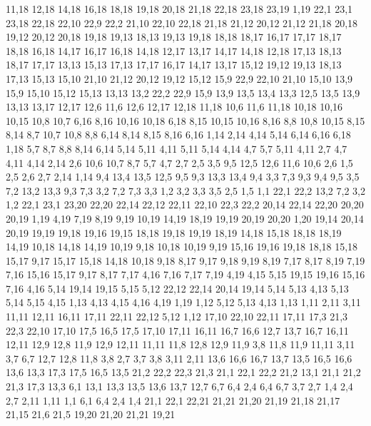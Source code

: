 11,18
12,18
14,18
16,18
18,18
19,18
20,18
21,18
22,18
23,18
23,19
1,19
%
22,1
23,1
23,18
22,18
22,10
22,9
22,2
%
21,10
22,10
22,18
21,18
21,12
%
20,12
21,12
21,18
20,18
%
19,12
20,12
20,18
19,18
19,13
%
18,13
19,13
19,18
18,18
18,17
%
16,17
17,17
18,17
18,18
16,18
%
14,17
16,17
16,18
14,18
%
12,17
13,17
14,17
14,18
12,18
%
17,13
18,13
18,17
17,17
%
13,13
15,13
17,13
17,17
16,17
14,17
13,17
%
15,12
19,12
19,13
18,13
17,13
15,13
%
15,10
21,10
21,12
20,12
19,12
15,12
%
15,9
22,9
22,10
21,10
15,10
%
13,9
15,9
15,10
15,12
15,13
13,13
%
13,2
22,2
22,9
15,9
13,9
13,5
13,4
13,3
%
12,5
13,5
13,9
13,13
13,17
12,17
12,6
%
11,6
12,6
12,17
12,18
11,18
%
10,6
11,6
11,18
10,18
10,16
10,15
10,8
10,7
%
6,16
8,16
10,16
10,18
6,18
%
8,15
10,15
10,16
8,16
%
8,8
10,8
10,15
8,15
8,14
%
8,7
10,7
10,8
8,8
%
6,14
8,14
8,15
8,16
6,16
%
1,14
2,14
4,14
5,14
6,14
6,16
6,18
1,18
%
5,7
8,7
8,8
8,14
6,14
5,14
5,11
%
4,11
5,11
5,14
4,14
%
4,7
5,7
5,11
4,11
%
2,7
4,7
4,11
4,14
2,14
%
2,6
10,6
10,7
8,7
5,7
4,7
2,7
%
2,5
3,5
9,5
12,5
12,6
11,6
10,6
2,6
%
1,5
2,5
2,6
2,7
2,14
1,14
%
9,4
13,4
13,5
12,5
9,5
%
9,3
13,3
13,4
9,4
%
3,3
7,3
9,3
9,4
9,5
3,5
%
7,2
13,2
13,3
9,3
7,3
%
3,2
7,2
7,3
3,3
%
1,2
3,2
3,3
3,5
2,5
1,5
%
1,1
22,1
22,2
13,2
7,2
3,2
1,2
22,1
23,1
23,20
22,20
22,14
22,12
22,11
22,10
22,3
22,2
%
20,14
22,14
22,20
20,20
20,19
%
1,19
4,19
7,19
8,19
9,19
10,19
14,19
18,19
19,19
20,19
20,20
1,20
%
19,14
20,14
20,19
19,19
19,18
19,16
19,15
%
18,18
19,18
19,19
18,19
%
14,18
15,18
18,18
18,19
14,19
%
10,18
14,18
14,19
10,19
%
9,18
10,18
10,19
9,19
%
15,16
19,16
19,18
18,18
15,18
15,17
%
9,17
15,17
15,18
14,18
10,18
9,18
%
8,17
9,17
9,18
9,19
8,19
%
7,17
8,17
8,19
7,19
%
7,16
15,16
15,17
9,17
8,17
7,17
%
4,16
7,16
7,17
7,19
4,19
%
4,15
5,15
19,15
19,16
15,16
7,16
4,16
%
5,14
19,14
19,15
5,15
%
5,12
22,12
22,14
20,14
19,14
5,14
5,13
%
4,13
5,13
5,14
5,15
4,15
%
1,13
4,13
4,15
4,16
4,19
1,19
%
1,12
5,12
5,13
4,13
1,13
%
1,11
2,11
3,11
11,11
12,11
16,11
17,11
22,11
22,12
5,12
1,12
%
17,10
22,10
22,11
17,11
%
17,3
21,3
22,3
22,10
17,10
17,5
%
16,5
17,5
17,10
17,11
16,11
16,7
16,6
%
12,7
13,7
16,7
16,11
12,11
12,9
12,8
%
11,9
12,9
12,11
11,11
%
11,8
12,8
12,9
11,9
%
3,8
11,8
11,9
11,11
3,11
%
3,7
6,7
12,7
12,8
11,8
3,8
%
2,7
3,7
3,8
3,11
2,11
%
13,6
16,6
16,7
13,7
%
13,5
16,5
16,6
13,6
%
13,3
17,3
17,5
16,5
13,5
%
21,2
22,2
22,3
21,3
%
21,1
22,1
22,2
21,2
%
13,1
21,1
21,2
21,3
17,3
13,3
%
6,1
13,1
13,3
13,5
13,6
13,7
12,7
6,7
6,4
%
2,4
6,4
6,7
3,7
2,7
%
1,4
2,4
2,7
2,11
1,11
%
1,1
6,1
6,4
2,4
1,4
21,1
22,1
22,21
21,21
21,20
21,19
21,18
21,17
21,15
21,6
21,5
%
19,20
21,20
21,21
19,21
